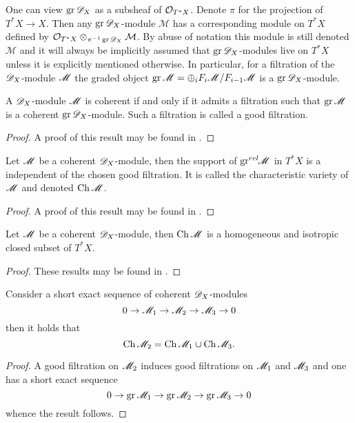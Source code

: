 One can view $\operatorname{gr}\mathscr{D}_X$ as a subsheaf of $\mathcal{O}_{T^*X}$.
Denote $\pi$ for the projection of $T^*X \to X$.
Then any $\operatorname{gr}\mathscr{D}_X$-module $\mathcal{M}$ has a corresponding module on $T^* X$ defined by $\mathcal{O}_{T^*X} \otimes_{\pi^{-1}\operatorname{gr} \mathscr{D}_X} \mathcal{M}$.
By abuse of notation this module is still denoted $\mathcal{M}$ and it will always be implicitly assumed that $\operatorname{gr} \mathscr{D}_X$-modules live on $T^*X$ unless it is explicitly mentioned otherwise.
In particular, for a filtration of the $\mathscr{D}_X$-module $\mathscr{M}$ the graded object $\operatorname{gr} \mathscr{M} = \oplus_i F_i \mathscr{M} / F_{i-1}\mathscr{M}$ is a $\operatorname{gr} \mathscr{D}_X$-module.

\begin{proposition}
  A $\mathscr{D}_X$-module $\mathscr{M}$ is coherent if and only if it admits a filtration such that $\operatorname{gr} \mathscr{M}$ is a coherent $\operatorname{gr} \mathscr{D}_X$-module. Such a filtration is called a good filtration.
\end{proposition}
\begin{proof}
  A proof of this result may be found in \cite[Chapter 2]{hotta2007d}.
\end{proof}
\begin{proposition}
  Let $\mathscr{M}$ be a coherent $\mathscr{D}_X$-module, then the support of $\operatorname{gr}^{rel}\mkern-5mu\mathscr{M}$ in $T^* X$ is a independent of the chosen good filtration. It is called the characteristic variety of $\mathscr{M}$ and denoted $\operatorname{Ch} \mathscr{M}$.
\end{proposition}
\begin{proof}
  A proof of this result may be found in \cite[Chapter 2]{hotta2007d}.
\end{proof}
\begin{proposition}\label{prop: StructureChVar}
  Let $\mathscr{M}$ be a coherent $\mathscr{D}_X$-module, then $\operatorname{Ch} \mathscr{M}$ is a homogeneous and isotropic closed subset of $T^* X$.
\end{proposition}
\begin{proof}
  These results may be found in \cite[Chapter 2]{kashiwara2003d}.
\end{proof}
\begin{proposition}
  Consider a short exact sequence of coherent $\mathscr{D}_X$-modules
  $$0 \to \mathscr{M}_1 \to \mathscr{M}_2 \to \mathscr{M}_3 \to 0 $$
  then it holds that
  $$\operatorname{Ch} \mathscr{M}_2 = \operatorname{Ch} \mathscr{M}_1 \cup \operatorname{Ch} \mathscr{M}_3. $$
\end{proposition}
\begin{proof}
  A good filtration on $\mathscr{M}_2$ induces good filtrations on $\mathscr{M}_1$ and $\mathscr{M}_3$ and one has a short exact sequence
  $$0\to \operatorname{gr} \mathscr{M}_1 \to \operatorname{gr} \mathscr{M}_2 \to \operatorname{gr} \mathscr{M}_3 \to 0 $$
  whence the result follows.
\end{proof}
